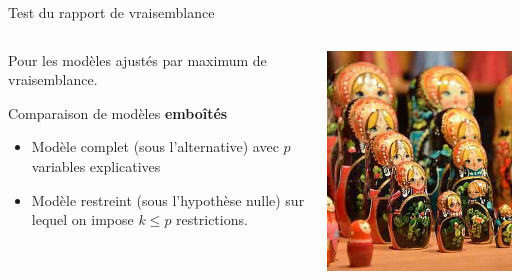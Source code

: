 \documentclass[
  ignorenonframetext,
]{beamer}
\providecommand{\tightlist}{%
  \setlength{\itemsep}{0pt}\setlength{\parskip}{0pt}}\usepackage{longtable,booktabs,array}
\begin{document}
\begin{frame}[fragile]{Test du rapport de vraisemblance}
\protect\hypertarget{test-du-rapport-de-vraisemblance}{}
\begin{columns}[T]
\begin{column}{0.6\textwidth}
Pour les modèles ajustés par maximum de vraisemblance.

Comparaison de modèles \textbf{emboîtés}

\begin{itemize}
\tightlist
\item
  Modèle complet (sous l'alternative) avec \(p\) variables explicatives
\item
  Modèle restreint (sous l'hypothèse nulle) sur lequel on impose
  \(k\leq p\) restrictions.
\end{itemize}
\end{column}

\begin{column}{0.4\textwidth}
\includegraphics[width=1\textwidth,height=\textheight]{figures/poupeesrusses.jpg}
\end{column}
\end{columns}
\end{frame}
\end{document}
